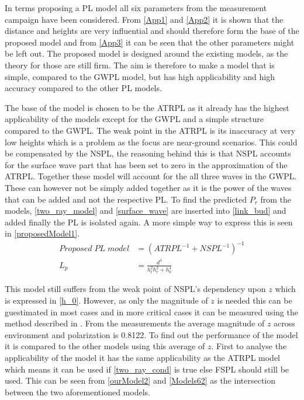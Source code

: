 

In terms proposing a PL model all six parameters from the measurement campaign have been considered. From \autoref{App1} and \autoref{App2} it is shown that the distance and heights are very influential and should therefore form the base of the proposed model and from \autoref{App3} it can be seen that the other parameters might be left out. %
The proposed model is designed around the existing models, as the theory for those are still firm. The aim is therefore to make a model that is simple, compared to the GWPL model, but has high applicability and high accuracy compared to the other PL models. 


The base of the model is chosen to be the ATRPL as it already has the highest applicability of the models except for the GWPL and a simple structure compared to the GWPL. The weak point in the ATRPL is its inaccuracy at very low heights which is a problem as the focus are near-ground scenarios. This could be compensated by the NSPL, the reasoning behind this is that NSPL accounts for the surface wave part that has been set to zero in the approximation of the ATRPL. Together these model will account for the all three waves in the GWPL. These can however not be simply added together as it is the power of the waves that can be added and not the respective PL. To find the predicted $P_r$ from the models, \eqref{two_ray_model} and \eqref{surface_wave} are inserted into \eqref{link_bud} and added finally the PL is isolated again. A more simple way to express this is seen in \eqref{proposedModel1}.
\begin{align}
Proposed\; PL\; model &= \left(ATRPL^{-1} + NSPL^{-1}\right)^{-1} \label{proposedModel1}\\
L_p &= \frac{d^4}{h_t^2 h_r^2+h_0^4} \label{proposedModel2}
\end{align}

This model still suffers from the weak point of NSPL's dependency upon $z$ which is expressed in \eqref{h_0}. However, as only the magnitude of $z$ is needed this can be guestimated in most cases and in more critical cases it can be measured using the method described in \cite{Kim}. From the measurements the average magnitude of $z$ across environment and polarization is 0.8122. To find out the performance of the model it is compared to the other models using this average of $z$. First to analyse the applicability of the model it has the same applicability as the ATRPL model which means it can be used if \eqref{two_ray_cond} is true else FSPL should still be used. This can be seen from \autoref{ourModel2} and \autoref{Models62} as the intersection between the two aforementioned models.


